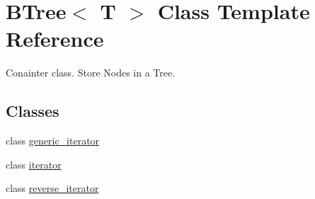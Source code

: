 \hypertarget{classBTree}{
\section{BTree$<$ T $>$ Class Template Reference}
\label{classBTree}
}


Conainter class. Store Nodes in a Tree.  


\subsection*{Classes}
\begin{DoxyCompactItemize}
\item 
class \hyperlink{classBTree_1_1generic__iterator}{generic\_\-iterator}
\item 
class \hyperlink{classBTree_1_1iterator}{iterator}
\item 
class \hyperlink{classBTree_1_1reverse__iterator}{reverse\_\-iterator}
\end{DoxyCompactItemize}
